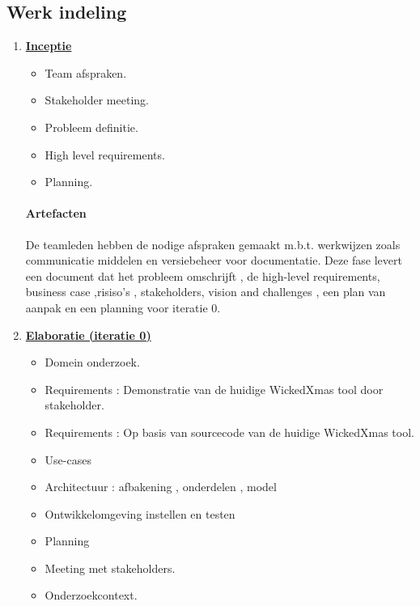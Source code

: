 
\subsection{Werk indeling}
\begin{enumerate}
\item \underline{\textbf{Inceptie}}
		\begin{itemize}
			\item Team afspraken.
			\item Stakeholder meeting.
			\item Probleem definitie.
			\item High level requirements.
			\item Planning. 
		\end{itemize}
		\paragraph{Artefacten}
		De teamleden hebben de nodige afspraken gemaakt m.b.t. werkwijzen zoals communicatie middelen en versiebeheer voor documentatie. Deze fase levert een document dat het probleem omschrijft , de high-level requirements, business case ,risiso's , stakeholders, vision and challenges , een plan van aanpak en een planning voor iteratie 0.
	
\item \underline{\textbf{Elaboratie (iteratie 0)}}
	\begin{itemize}
		\item Domein onderzoek.
		\item Requirements : Demonstratie van de huidige WickedXmas tool door stakeholder.
		\item Requirements : Op basis van sourcecode van de huidige WickedXmas tool.
		\item Use-cases
		\item Architectuur : afbakening , onderdelen , model
		\item Ontwikkelomgeving instellen en testen
		\item Planning
		\item Meeting met stakeholders.
		\item Onderzoekcontext.
	\end{itemize}

\end{enumerate}
